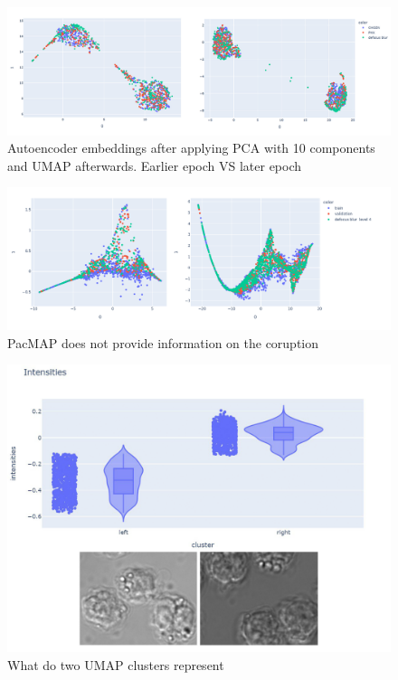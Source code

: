 \begin{figure}[htb]
	\begin{center}
		\includegraphics[width=0.5\linewidth]{bilder/ae-embeddings/pca-umap-clusters.png}
		\caption{Autoencoder embeddings after applying PCA with 10 components and UMAP afterwards. Earlier epoch VS later epoch}\label{fig:ae-pca-umap-clustered}
	\end{center}
\end{figure}

\begin{figure}[htb]
	\begin{center}
		\includegraphics[width=0.5\linewidth]{bilder/ae-embeddings/pacmap.png}
		\caption{PacMAP does not provide information on the coruption}\label{fig:ae-pacmap}
	\end{center}
\end{figure}

\begin{figure}[H]
	\begin{center}
		\includegraphics[width=0.5\linewidth]{bilder/ae-embeddings/brighter-darker.png}
		\caption{What do two UMAP clusters represent}\label{fig:ae-brighter-darker}
	\end{center}
\end{figure}



